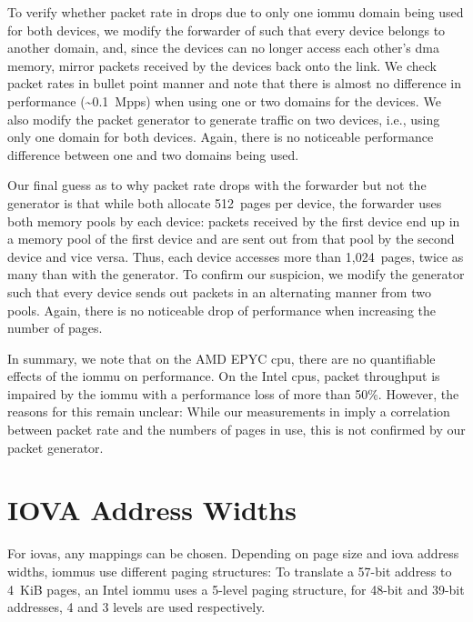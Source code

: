 To verify whether packet rate in  drops due to
only one \ac{iommu} domain being used for both devices, we modify the forwarder
of  such that every device belongs to another
domain, and, since the devices can no longer access each other's \ac{dma}
memory, mirror packets received by the devices back onto the link. We check
packet rates in bullet point manner and note that there is almost no difference
in performance (\textasciitilde 0.1~Mpps) when using one or two domains for the
devices. We also modify the packet generator  to
generate traffic on two devices, i.e., using only one domain for both devices.
Again, there is no noticeable performance difference between one and two domains
being used.

Our final guess as to why packet rate drops with the forwarder but not the
generator is that while both allocate 512~pages per device, the forwarder uses
both memory pools by each device: packets received by the first device end up in
a memory pool of the first device and are sent out from that pool by the second
device and vice versa. Thus, each device accesses more than 1,024~pages, twice
as many than with the generator. To confirm our suspicion, we modify the
generator such that every device sends out packets in an alternating manner from
two pools. Again, there is no noticeable drop of performance when increasing the
number of pages.

In summary, we note that on the AMD EPYC \ac{cpu}, there are no quantifiable
effects of the \ac{iommu} on performance. On the Intel \acp{cpu}, packet
throughput is impaired by the \ac{iommu} with a performance loss of more than
50\%. However, the reasons for this remain unclear: While our measurements in
 imply a correlation between packet rate and the
numbers of pages in use, this is not confirmed by our packet generator.


\section{IOVA Address Widths}
\label{sec:iova_address_widths}

For \acp{iova}, any mappings can be chosen. Depending on page size and \ac{iova}
address widths, \acp{iommu} use different paging structures: To translate a
57-bit address to 4~KiB pages, an Intel \ac{iommu} uses a 5-level paging
structure, for 48-bit and 39-bit addresses, 4 and 3 levels are used
respectively.

